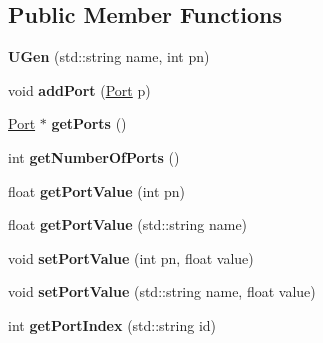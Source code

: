 \subsection*{Public Member Functions}
\begin{DoxyCompactItemize}
\item 
{\bfseries U\+Gen} (std\+::string name, int pn)\hypertarget{classunit_1_1UGen_af2d6d70e1340c9853a9a329cb2db164a}{}\label{classunit_1_1UGen_af2d6d70e1340c9853a9a329cb2db164a}

\item 
void {\bfseries add\+Port} (\hyperlink{classPort}{Port} p)\hypertarget{classunit_1_1UGen_a7d5be76c0847cea2ffd9fb6118dad84b}{}\label{classunit_1_1UGen_a7d5be76c0847cea2ffd9fb6118dad84b}

\item 
\hyperlink{classPort}{Port} $\ast$ {\bfseries get\+Ports} ()\hypertarget{classunit_1_1UGen_a2dbed70294dba960bebb4e6e6196f93f}{}\label{classunit_1_1UGen_a2dbed70294dba960bebb4e6e6196f93f}

\item 
int {\bfseries get\+Number\+Of\+Ports} ()\hypertarget{classunit_1_1UGen_a1f7c0151b63c89a92ea7b3b598969fb5}{}\label{classunit_1_1UGen_a1f7c0151b63c89a92ea7b3b598969fb5}

\item 
float {\bfseries get\+Port\+Value} (int pn)\hypertarget{classunit_1_1UGen_a5790d6f5f741d9286e12f27eafd86bd5}{}\label{classunit_1_1UGen_a5790d6f5f741d9286e12f27eafd86bd5}

\item 
float {\bfseries get\+Port\+Value} (std\+::string name)\hypertarget{classunit_1_1UGen_a2a33803a853db61cc79cc6da90ce511d}{}\label{classunit_1_1UGen_a2a33803a853db61cc79cc6da90ce511d}

\item 
void {\bfseries set\+Port\+Value} (int pn, float value)\hypertarget{classunit_1_1UGen_ae933825c4201f13cb481d399de1bd4d5}{}\label{classunit_1_1UGen_ae933825c4201f13cb481d399de1bd4d5}

\item 
void {\bfseries set\+Port\+Value} (std\+::string name, float value)\hypertarget{classunit_1_1UGen_a1ed212c207052705c9fbd2fb64fe1092}{}\label{classunit_1_1UGen_a1ed212c207052705c9fbd2fb64fe1092}

\item 
int {\bfseries get\+Port\+Index} (std\+::string id)\hypertarget{classunit_1_1UGen_a7caac30e931fe2e39c53be9a084e2709}{}\label{classunit_1_1UGen_a7caac30e931fe2e39c53be9a084e2709}


\end{DoxyCompactItemize}
